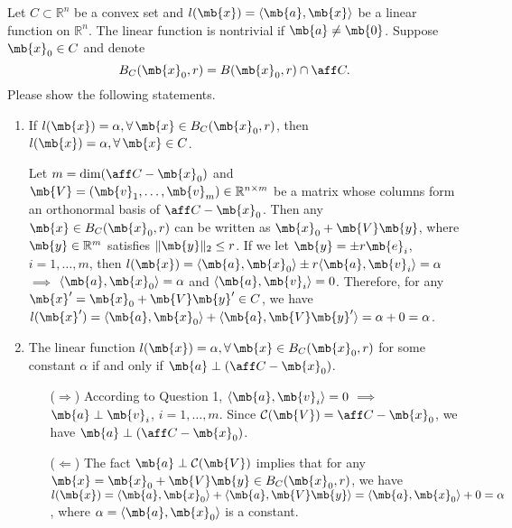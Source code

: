\begin{exercise}
  Let $C\subset\mathbb{R}^n$ be a convex set and $l(\mb{x})=\langle \mb{a},\mb{x}\rangle$ be a linear function on $\mathbb{R}^n$. The linear function is nontrivial if $\mb{a}\neq\mb{0}$. Suppose $\mb{x}_0\in C$ and denote $$
    B_C(\mb{x}_0,r)=B(\mb{x}_0,r)\cap\aff C.$$
  Please show the following statements.
  \begin{enumerate}
    \item
      If $l(\mb{x})=\alpha, \forall\,\mb{x}\in B_C(\mb{x}_0,r)$, then  $l(\mb{x})=\alpha, \forall\,\mb{x}\in C$.
      \begin{solution}
        Let $m=\dim(\aff C-\mb{x}_0)$ and $\mb{V} = (\mb{v}_1,\dots,\mb{v}_m)\in \mathbb{R}^{n\times m}$ be a matrix whose columns form an orthonormal basis of $\aff C-\mb{x}_0$. Then any $\mb{x}\in B_C(\mb{x}_0,r)$ can be written as $\mb{x}_0 + \mb{V}\mb{y}$, where $\mb{y}\in \mathbb{R}^m$ satisfies $\|\mb{y}\|_2\le r$. If we let $\mb{y}=\pm r\mb{e}_i$, $i=1,\dots,m$, then $l(\mb{x})=\langle\mb{a},\mb{x}_0\rangle \pm r\langle\mb{a},\mb{v}_i\rangle=\alpha$ $\implies$ $\langle\mb{a},\mb{x}_0\rangle = \alpha$ and $\langle\mb{a},\mb{v}_i\rangle = 0$. Therefore, for any $\mb{x}' = \mb{x}_0 + \mb{V}\mb{y}' \in C$, we have $l(\mb{x}')=\langle\mb{a},\mb{x}_0\rangle + \langle\mb{a},\mb{V}\mb{y}'\rangle=\alpha + 0 = \alpha$.
        \qedhere
      \end{solution}
    \item
      The linear function
      $l(\mb{x})=\alpha,\forall\, \mb{x}\in B_C(\mb{x}_0,r)$ for some constant $\alpha$ if and only if $\mb{a}\perp (\aff C-\mb{x}_0)$.
      \begin{solution}
        \begin{itemize}
          \item []
          \item [($\Rightarrow$)]
            According to Question 1, $\langle\mb{a},\mb{v}_i\rangle = 0$ $\implies$ $\mb{a}\perp \mb{v}_i$, $i=1,\dots,m$. Since $\mathcal{C}(\mb{V})=\aff C-\mb{x}_0$, we have $\mb{a}\perp (\aff C-\mb{x}_0)$.   
          \item [($\Leftarrow$)]
            The fact $\mb{a}\perp \mathcal{C}(\mb{V})$ implies that for any $\mb{x} = \mb{x}_0 + \mb{V}\mb{y}\in B_C(\mb{x}_0,r)$, we have $l(\mb{x})=\langle\mb{a},\mb{x}_0\rangle + \langle\mb{a},\mb{V}\mb{y}\rangle=\langle\mb{a},\mb{x}_0\rangle + 0 = \alpha$, where $\alpha = \langle\mb{a},\mb{x}_0\rangle$ is a constant.
            \qedhere
        \end{itemize}

\end{solution}
\end{enumerate}
\end{exercise}
